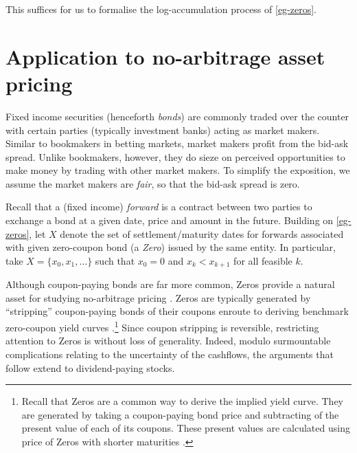 \documentclass[12pt,a4paper,twoside]{article}
\begin{document}
This suffices for us to formalise the log-accumulation process of
\cref{eg-zeros}.

\section{Application to no-arbitrage asset pricing}\label{sec-fin-app} Fixed
income securities (henceforth \emph{bonds}) are commonly traded over the
counter with certain parties (typically investment banks) acting as market
makers. Similar to bookmakers in betting markets, market makers profit from the
bid-ask spread. Unlike bookmakers, however, they do sieze on perceived
opportunities to make money by trading with other market makers. To simplify
the exposition, we assume the market makers are \emph{fair}, so that the
bid-ask spread is zero.

Recall that a (fixed income) \emph{forward} is a contract between two parties
to exchange a bond at a given date, price and amount in the future.  Building
on \cref{eg-zeros}, let $X$ denote the set of settlement/maturity dates for
forwards associated with given zero-coupon bond (a \emph{Zero}) issued by the
same entity. In particular, take $X = \{x_0, x_1, \dots\}$ such that $x_0 = 0$
and $x_k < x_{k + 1}$ for all feasible $k$.
\begin{remark*}
  Although coupon-paying bonds are far more common, Zeros provide a natural
  asset for studying no-arbitrage pricing \citep{BN-empirical-no-arbitrage}.
  Zeros are typically generated by ``stripping'' coupon-paying bonds of their
  coupons enroute to deriving benchmark zero-coupon yield curves
  \citep{BIS-zeros}.\footnote{Recall that Zeros are a common way to derive the
  implied yield curve. They are generated by taking a coupon-paying bond price
  and subtracting of the present value of each of its coupons. These present
  values are calculated using price of Zeros with shorter maturities
  \citep{Brealey-Myers}.} Since coupon stripping is reversible, restricting
  attention to Zeros is without loss of generality.  Indeed, modulo
  surmountable complications relating to the uncertainty of the cashflows, the
  arguments that follow extend to dividend-paying stocks.
\end{remark*}
\end{document}
